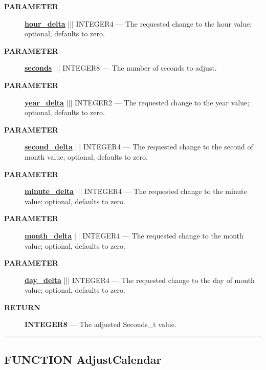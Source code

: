 \par
\begin{description}
\item [\colorbox{tagtype}{\color{white} \textbf{\textsf{PARAMETER}}}] \textbf{\underline{hour\_delta}} ||| INTEGER4 --- The requested change to the hour value; optional, defaults to zero.
\item [\colorbox{tagtype}{\color{white} \textbf{\textsf{PARAMETER}}}] \textbf{\underline{seconds}} ||| INTEGER8 --- The number of seconds to adjust.
\item [\colorbox{tagtype}{\color{white} \textbf{\textsf{PARAMETER}}}] \textbf{\underline{year\_delta}} ||| INTEGER2 --- The requested change to the year value; optional, defaults to zero.
\item [\colorbox{tagtype}{\color{white} \textbf{\textsf{PARAMETER}}}] \textbf{\underline{second\_delta}} ||| INTEGER4 --- The requested change to the second of month value; optional, defaults to zero.
\item [\colorbox{tagtype}{\color{white} \textbf{\textsf{PARAMETER}}}] \textbf{\underline{minute\_delta}} ||| INTEGER4 --- The requested change to the minute value; optional, defaults to zero.
\item [\colorbox{tagtype}{\color{white} \textbf{\textsf{PARAMETER}}}] \textbf{\underline{month\_delta}} ||| INTEGER4 --- The requested change to the month value; optional, defaults to zero.
\item [\colorbox{tagtype}{\color{white} \textbf{\textsf{PARAMETER}}}] \textbf{\underline{day\_delta}} ||| INTEGER4 --- The requested change to the day of month value; optional, defaults to zero.
\end{description}







\par
\begin{description}
\item [\colorbox{tagtype}{\color{white} \textbf{\textsf{RETURN}}}] \textbf{INTEGER8} --- The adjusted Seconds\_t value.
\end{description}




\rule{\linewidth}{0.5pt}
\subsection*{\textsf{\colorbox{headtoc}{\color{white} FUNCTION}
AdjustCalendar}}

